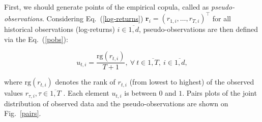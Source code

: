 \documentclass{llncs}
\begin{document}
First, we should generate points of the empirical copula, %
called as \textit{pseudo-observations}. %
Considering  Eq.~(\ref{log-returns}) $\boldsymbol{r}_i = (r_{1,i}, \ldots, r_{T,i})^\intercal$ for all historical observations (log-returns) $i \in \overline{1,d}$, pseudo-observations are then defined via the Eq.~(\ref{pobs}):

\begin{equation} \label{pobs}
    u_{t,i} = \frac{\text{rg}(r_{t,i})}{T + 1},\ \forall \ t \in \overline{1,T},\ i \in \overline{1,d},
\end{equation}

\noindent where $\text{rg}(r_{t,i})$ denotes the rank of $r_{t,i}$ (from lowest to highest) of the observed values $r_{\tau,i}, \tau \in \overline{1,T}$ \cite{Copula}. Each element $u_{t,i}$ is
between $0$ and $1$. Pairs plots of the joint distribution of observed data and the pseudo-observations are shown on Fig.~\ref{pairs}.

\end{document}
